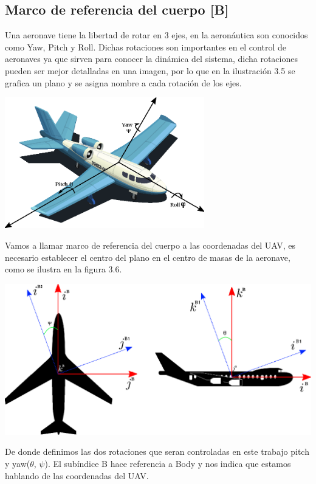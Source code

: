 \subsection{Marco de referencia del cuerpo [B]}
Una aeronave tiene la libertad de rotar en 3 ejes, en la aeronáutica son conocidos como
Yaw, Pitch y Roll. Dichas rotaciones son importantes en el control de aeronaves ya
que sirven para conocer la dinámica del sistema, dicha rotaciones pueden ser mejor
detalladas en una imagen, por lo que en la ilustración 3.5 se grafica un plano
y se asigna nombre a cada rotación de los ejes.
\begin{center}
	\includegraphics[width=0.65\textwidth]{Contenido/Cuerpo/Capitulo3/Fig6.eps}
	\label{fig:ModeloMat:Fig1}
\end{center}
Vamos a llamar marco de referencia del cuerpo a las coordenadas del UAV, es necesario establecer el centro del plano en el
centro de masas de la aeronave, como se ilustra en la figura 3.6.
\begin{center}
	\includegraphics[width=0.9 \textwidth]{Contenido/Cuerpo/Capitulo3/Fig5.eps}
	\label{fig:ModeloMat:Fig1}
\end{center}
De donde definimos las dos rotaciones que seran controladas en este trabajo pitch y yaw($\theta$, $\psi$). El subíndice B hace referencia
a Body y nos indica que estamos hablando de las coordenadas del UAV.

